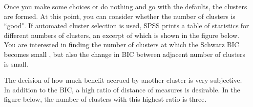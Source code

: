\documentclass[PredictiveAnalytics101.tex]{subfiles}
\begin{document}
\begin{frame}
Once you make some choices or do nothing and go with the defaults, the clusters are
formed. At this point, you can consider whether the number of clusters is ``good". If
automated cluster selection is used, SPSS prints a table of statistics for different
numbers of clusters, an excerpt of which is shown in the figure below. You are interested
in finding the number of clusters at which the Schwarz BIC becomes small , but also the change in BIC between
adjacent number of clusters is small. 

The decision of how much benefit accrued by another cluster is very subjective. In addition to the BIC, a high ratio of distance of measures is desirable. In the figure below, the number of clusters with this highest ratio is three.

\end{frame}
\end{document}
